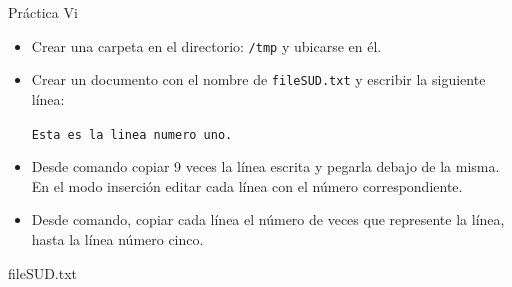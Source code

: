 \documentclass{beamer}
\begin{document}
\begin{frame}{Práctica Vi}
\begin{itemize}
    \item Crear una carpeta en el directorio: \texttt{/tmp} y ubicarse en él.
    \item Crear un documento con el nombre de \texttt{fileSUD.txt} y escribir la siguiente línea:
    \begin{center}
        \texttt{Esta es la linea numero uno.}
    \end{center}
    \item Desde comando copiar 9 veces la línea escrita y pegarla debajo de la misma. En el modo inserción editar cada línea con el número correspondiente.
    \item Desde comando, copiar cada línea el número de veces que represente la línea, hasta la línea número cinco.
\end{itemize}
\end{frame}
\begin{frame}{fileSUD.txt}

\end{frame}
\end{document}
